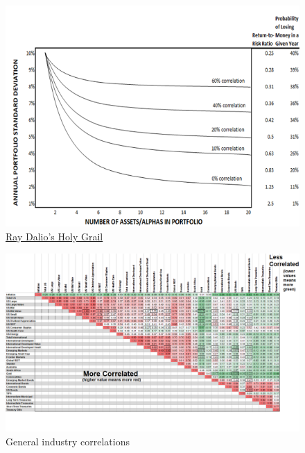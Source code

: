 \documentclass{article}
\begin{document}
\begin{figure}[!htb]
    \centering
    \includegraphics[width=.9\textwidth]{imgs/103.png}
    \caption{\href{https://youtu.be/Nu4lHaSh7D4}{Ray Dalio's Holy Grail}}
\end{figure}

\vspace{10pt}

\begin{figure}[!htb]
    \centering
    \includegraphics[width=\textwidth]{imgs/104.png}
    \caption{General industry correlations}
\end{figure}

\vspace{10pt}
\end{document}
